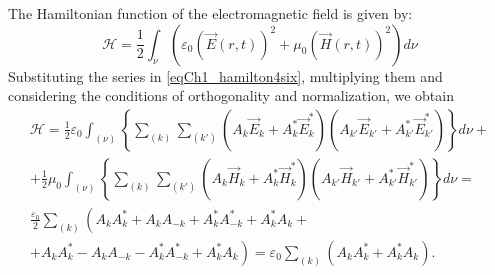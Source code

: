 The Hamiltonian function of the electromagnetic field is given by:
\begin{equation}
\mathcal{H} = \frac{1}{2}
\int_{\nu}\left( \varepsilon_0\left(\vec{E}\left(r,t\right)\right)^2 + \mu_0
\left(\vec{H}\left(r,t\right)\right)^2\right) d\nu
\label{eqCh1_hamilton4six}
\end{equation}
Substituting the series in \eqref{eqCh1_hamilton4six}, multiplying them and considering the conditions of orthogonality and normalization, we obtain 
\begin{eqnarray}
\mathcal{H} = \frac{1}{2} \varepsilon_0
\int_{(\nu)}\left\{
\sum_{(k)}\sum_{(k')}
\left(A_k\vec{E}_k + A_k^{*}\vec{E}_k^{*}\right)
\left(A_{k'}\vec{E}_{k'} + A_{k'}^{*}\vec{E}_{k'}^{*}\right)
\right\}d \nu +
\nonumber \\
+ 
\frac{1}{2} \mu_0
\int_{(\nu)}\left\{
\sum_{(k)}\sum_{(k')}
\left(A_k\vec{H}_k + A_k^{*}\vec{H}_k^{*}\right)
\left(A_{k'}\vec{H}_{k'} + A_{k'}^{*}\vec{H}_{k'}^{*}\right)
\right\} d \nu = 
\nonumber \\
\frac{\varepsilon_0}{2} \sum_{(k)} 
\left(
A_k A_k^{*} + A_k A_{-k} + A_k^{*} A_{-k}^{*} + A_k^{*} A_k +
\right.
\nonumber \\
\left.
+ A_k A_k^{*} - A_k A_{-k} - A_k^{*} A_{-k}^{*} + A_k^{*} A_k
\right) = \varepsilon_0 \sum_{(k)} 
\left(A_k A_k^{*} + A_k^{*} A_k \right).
\label{eqCh1_separation4hamilton}
\end{eqnarray}